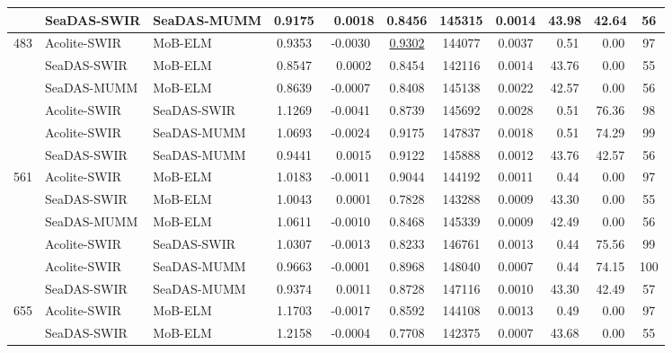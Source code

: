 \begin{landscape}
\begin{table}[htb!]
\begin{tabular}{cllcccccccc}
      &   SeaDAS-SWIR   &  SeaDAS-MUMM  & 0.9175  & ~0.0018 & 0.8456  & 145315  & 0.0014  &  43.98      & 42.64            &   56      \\  \hline
\multirow{6}{*}{483}&Acolite-SWIR&MoB-ELM     & 0.9353  & -0.0030 & \underline{0.9302}  & 144077  & 0.0037  &  ~0.51      & ~0.00            &   97      \\
      &   SeaDAS-SWIR   &  MoB-ELM      & 0.8547  & ~0.0002 & 0.8454  & 142116  & 0.0014  &  43.76      & ~0.00            &   55      \\
      &   SeaDAS-MUMM   &  MoB-ELM      & 0.8639  & -0.0007 & 0.8408  & 145138  & 0.0022  &  42.57      & ~0.00            &   56      \\ 
      &   Acolite-SWIR  &  SeaDAS-SWIR  & 1.1269  & -0.0041 & 0.8739  & 145692  & 0.0028  &  ~0.51      & 76.36            &   98      \\
      &   Acolite-SWIR  &  SeaDAS-MUMM  & 1.0693  & -0.0024 & 0.9175  & 147837  & 0.0018  &  ~0.51      & 74.29            &   99      \\
      &   SeaDAS-SWIR   &  SeaDAS-MUMM  & 0.9441  & ~0.0015 & 0.9122  & 145888  & 0.0012  &  43.76      & 42.57            &   56      \\ \hline
\multirow{6}{*}{561}&Acolite-SWIR&  MoB-ELM   & 1.0183  & -0.0011 & 0.9044  & 144192  & 0.0011  &  ~0.44      & ~0.00            &   97      \\
      &   SeaDAS-SWIR   &  MoB-ELM      & 1.0043  & ~0.0001 & 0.7828  & 143288  & 0.0009  &  43.30      & ~0.00            &   55      \\
      &   SeaDAS-MUMM   &  MoB-ELM      & 1.0611  & -0.0010 & 0.8468  & 145339  & 0.0009  &  42.49      & ~0.00            &   56      \\
      &   Acolite-SWIR  &  SeaDAS-SWIR  & 1.0307  & -0.0013 & 0.8233  & 146761  & 0.0013  &  ~0.44      & 75.56            &   99      \\
      &   Acolite-SWIR  &  SeaDAS-MUMM  & 0.9663  & -0.0001 & 0.8968  & 148040  & 0.0007  &  ~0.44      & 74.15            &   100     \\
        &   SeaDAS-SWIR   &  SeaDAS-MUMM  & 0.9374  & ~0.0011 & 0.8728  & 147116  & 0.0010  &  43.30      & 42.49            &   57      \\ \hline
\multirow{6}{*}{655}&Acolite-SWIR&MoB-ELM     & 1.1703  & -0.0017 & 0.8592  & 144108  & 0.0013  &  ~0.49      & ~0.00            &   97      \\
      &   SeaDAS-SWIR   &  MoB-ELM      & 1.2158  & -0.0004 & 0.7708  & 142375  & 0.0007  &  43.68      & ~0.00            &   55      \\

\end{tabular}
\end{table}
\end{landscape}
